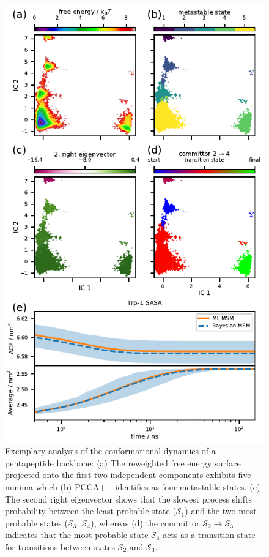 \documentclass[9pt,tutorial]{livecoms}
\begin{document}
\begin{figure}
\includegraphics{figure_3}
\caption{Exemplary analysis of the conformational dynamics of a pentapeptide backbone:
(a) The reweighted free energy surface projected onto the first two independent components exhibits five minima which
(b) PCCA++ identifies as four metastable states.
(c) The second right eigenvector shows that the slowest process shifts probability between the least probable state ($\mathcal{S}_1$) and the two most probable states ($\mathcal{S}_3$, $\mathcal{S}_4$), whereas
(d) the committor $\mathcal{S}_2\to\mathcal{S}_3$ indicates that the most probable state $\mathcal{S}_4$ acts as a transition state for transitions between states $\mathcal{S}_2$ and $\mathcal{S}_3$.
}
\end{figure}
\end{document}
